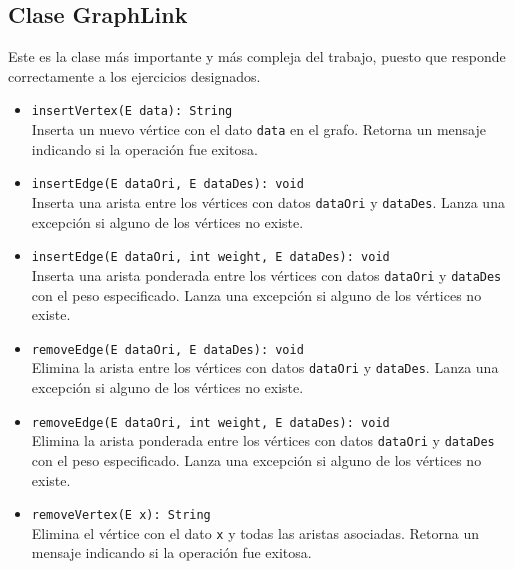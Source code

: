 \documentclass{article}
\begin{document}
        \subsection{Clase GraphLink}\par  

            Este es la clase más importante y más compleja del trabajo, puesto que responde correctamente a los ejercicios designados.
            
            

            \begin{itemize}
                \item \texttt{insertVertex(E data): String}\\
                Inserta un nuevo vértice con el dato \texttt{data} en el grafo. Retorna un mensaje indicando si la operación fue exitosa.
                
                \item \texttt{insertEdge(E dataOri, E dataDes): void}\\
                Inserta una arista entre los vértices con datos \texttt{dataOri} y \texttt{dataDes}. Lanza una excepción si alguno de los vértices no existe.
                
                \item \texttt{insertEdge(E dataOri, int weight, E dataDes): void}\\
                Inserta una arista ponderada entre los vértices con datos \texttt{dataOri} y \texttt{dataDes} con el peso especificado. Lanza una excepción si alguno de los vértices no existe.
                
                \item \texttt{removeEdge(E dataOri, E dataDes): void}\\
                Elimina la arista entre los vértices con datos \texttt{dataOri} y \texttt{dataDes}. Lanza una excepción si alguno de los vértices no existe.
                
                \item \texttt{removeEdge(E dataOri, int weight, E dataDes): void}\\
                Elimina la arista ponderada entre los vértices con datos \texttt{dataOri} y \texttt{dataDes} con el peso especificado. Lanza una excepción si alguno de los vértices no existe.
                
                \item \texttt{removeVertex(E x): String}\\
                Elimina el vértice con el dato \texttt{x} y todas las aristas asociadas. Retorna un mensaje indicando si la operación fue exitosa.
                

\end{itemize}
\end{document}
